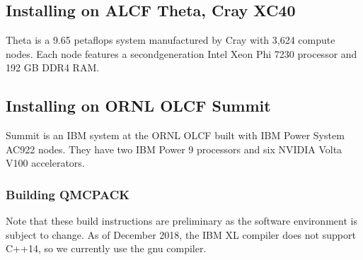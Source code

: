 \documentclass[letterpaper,10pt,english]{sphinxmanual}
\begin{document}
\subsection{Installing on ALCF Theta, Cray XC40}
\label{\detokenize{installation:installing-on-alcf-theta-cray-xc40}}
Theta is a 9.65 petaflops system manufactured by Cray with 3,624 compute nodes.
Each node features a second\sphinxhyphen{}generation Intel Xeon Phi 7230 processor and 192 GB DDR4 RAM.

\begin{sphinxVerbatim}[commandchars=\\\{\}]
 
  
  
  
     
 
 
  
  
\end{sphinxVerbatim}


\subsection{Installing on ORNL OLCF Summit}
\label{\detokenize{installation:installing-on-ornl-olcf-summit}}
Summit is an IBM system at the ORNL OLCF built with IBM Power System AC922
nodes. They have two IBM Power 9 processors and six NVIDIA Volta V100
accelerators.


\subsubsection{Building QMCPACK}
\label{\detokenize{installation:building-qmcpack}}
Note that these build instructions are preliminary as the
software environment is subject to change. As of December 2018, the
IBM XL compiler does not support C++14, so we currently use the
gnu compiler.
\end{document}
